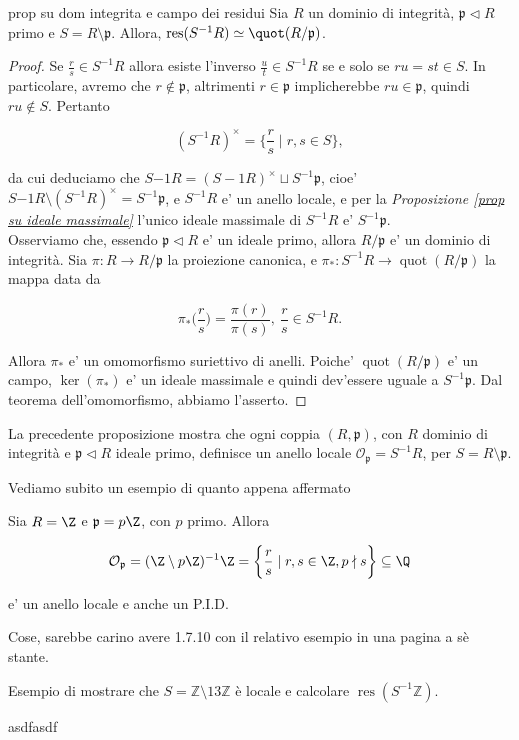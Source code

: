 \begin{prop}[1.7.10]{prop su dom integrita e campo dei residui}
  Sia $R$ un dominio di integrità, $\mathfrak{p}\lhd R$ primo e $S=R\setminus \mathfrak{p}$. Allora, $\operatorname{res}(S^{-1}R)\simeq \quot(R/\mathfrak{p})$.
\end{prop}
\vspace{-4mm}
\begin{proof}
  Se $\frac{r}{s} \in S^{-1}R$ allora esiste l'inverso $\frac{u}{t}\in S^{-1}R$ se e solo se $ru = st \in S$. In particolare, avremo che
  $r \not\in \mathfrak{p}$, altrimenti $r \in \mathfrak{p}$ implicherebbe $ru \in \mathfrak{p}$, quindi $ru \not\in S$. Pertanto

  \[ (S^{-1}R)^{\times} = \bigg\{ \frac{r}{s} \mid r,s \in S \bigg\}, \]

  \noindent da cui deduciamo che $S{-1}R = (S-{1}R)^{\times} \sqcup S^{-1}\mathfrak{p}$, cioe' $S{-1}R \setminus (S^{-1}R)^{\times} = S^{-1}\mathfrak{p}$,
  e $S^{-1}R$ e' un anello locale, e per la \emph{Proposizione \ref{prop su ideale massimale}} l'unico ideale massimale di $S^{-1}R$ e' $S^{-1}\mathfrak{p}$. \\
  \noindent Osserviamo che, essendo $\mathfrak{p} \lhd R$ e' un ideale primo, allora $R/\mathfrak{p}$ e' un dominio di integrità.
  Sia $\pi : R \rightarrow R/\mathfrak{p}$ la proiezione canonica, e $\pi_* : S^{-1}R \rightarrow \operatorname{quot}(R/\mathfrak{p})$ la mappa data da

  \[ \pi_*\bigg(\frac{r}{s}\bigg) = \frac{\pi(r)}{\pi(s)},\ \frac{r}{s} \in S^{-1}R. \]

  \noindent Allora $\pi_*$ e' un omomorfismo suriettivo di anelli. Poiche' $\operatorname{quot}(R/\mathfrak{p})$ e' un campo,
  $\ker(\pi_*)$ e' un ideale massimale e quindi dev'essere uguale a $S^{-1}\mathfrak{p}$. Dal teorema dell'omomorfismo, abbiamo l'asserto.
\end{proof}

\begin{obs}
  La precedente proposizione mostra che ogni coppia $(R, \mathfrak{p})$, con $R$ dominio di integrità e $\mathfrak{p} \lhd R$ ideale primo,
  definisce un anello locale $\mathcal{O}_\mathfrak{p} = S^{-1}R$, per $S = R \setminus \mathfrak{p}$.
\end{obs}

\noindent Vediamo subito un esempio di quanto appena affermato

\begin{exm}
  Sia $R = \Z$ e $\mathfrak{p} = p\Z$, con $p$ primo. Allora

  \[ \mathcal{O}_\mathfrak{p} = (\Z \setminus p\Z)^{-1}\Z = \bigg\{ \frac{r}{s} \mid r,s \in \Z, p \nmid s \bigg\} \subseteq \Q \]

  \noindent e' un anello locale e anche un P.I.D.
\end{exm}


\noindent Cose, sarebbe carino avere 1.7.10 con il relativo esempio in una pagina a sè stante.

\begin{exm}Esempio di mostrare che $S=\mathbb{Z}\setminus 13\mathbb{Z}$ è locale e calcolare $\operatorname{res}(S^{-1}\mathbb{Z})$.\end{exm}
asdfasdf